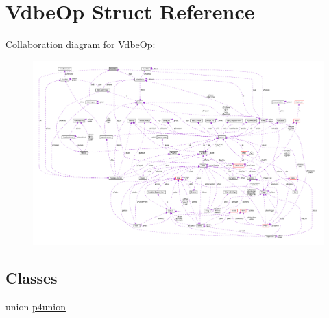 \hypertarget{structVdbeOp}{}\section{Vdbe\+Op Struct Reference}
\label{structVdbeOp}


Collaboration diagram for Vdbe\+Op\+:\nopagebreak
\begin{figure}[H]
\begin{center}
\leavevmode
\includegraphics[width=350pt]{structVdbeOp__coll__graph}
\end{center}
\end{figure}
\subsection*{Classes}
\begin{DoxyCompactItemize}
\item 
union \hyperlink{unionVdbeOp_1_1p4union}{p4union}
\end{DoxyCompactItemize}
